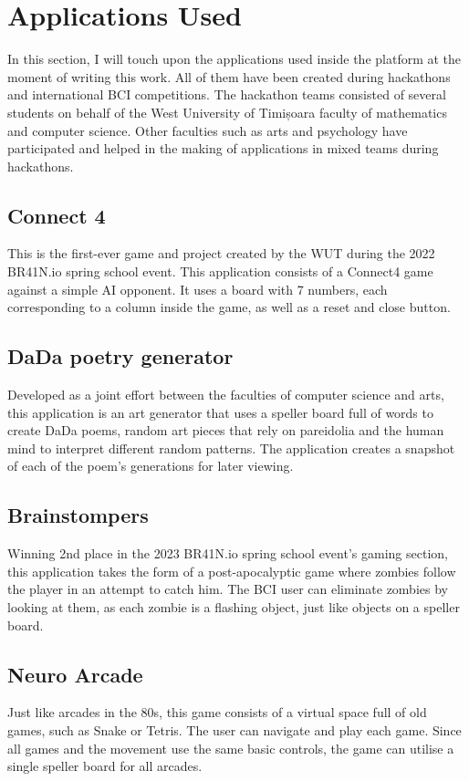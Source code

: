 \newpage

\section{Applications Used} \label{sect:Applications Used}
In this section, I will touch upon the applications used inside the platform at the moment of writing this work. All of them have been created during hackathons and international BCI competitions. The hackathon teams consisted of several students on behalf of the West University of Timișoara faculty of mathematics and computer science. Other faculties such as arts and psychology have participated and helped in the making of applications in mixed teams during hackathons.

\subsection{Connect 4}
This is the first-ever game and project created by the WUT during the 2022 BR41N.io spring school event. This application consists of a Connect4 game against a simple AI opponent. It uses a board with 7 numbers, each corresponding to a column inside the game, as well as a reset and close button. 

\subsection{DaDa poetry generator}
Developed as a joint effort between the faculties of computer science and arts, this application is an art generator that uses a speller board full of words to create DaDa poems, random art pieces that rely on pareidolia and the human mind to interpret different random patterns. The application creates a snapshot of each of the poem's generations for later viewing.

\subsection{Brainstompers}
Winning 2nd place in the 2023 BR41N.io spring school event's gaming section\cite{spring-school_2023}, this application takes the form of a post-apocalyptic game where zombies follow the player in an attempt to catch him. The BCI user can eliminate zombies by looking at them, as each zombie is a flashing object, just like objects on a speller board.

\subsection{Neuro Arcade}
Just like arcades in the 80s, this game consists of a virtual space full of old games, such as Snake or Tetris. The user can navigate and play each game. Since all games and the movement use the same basic controls, the game can utilise a single speller board for all arcades.


